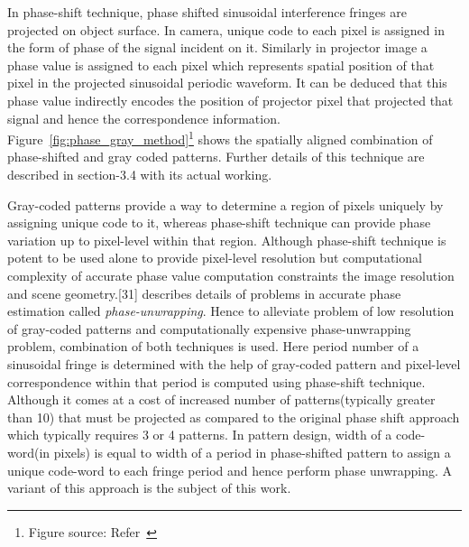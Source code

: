 \begin{enumerate}
\begin{enumerate}
In phase-shift technique, phase shifted sinusoidal interference fringes are projected on object surface. In camera, unique code to each pixel is assigned in the form of phase of the signal incident on it. Similarly in projector image a phase value is assigned to each pixel which represents spatial position of that pixel in the projected sinusoidal periodic waveform. It can be deduced that this phase value indirectly encodes the position of projector pixel that projected that signal and hence the correspondence information. Figure~\ref{fig:phase_gray_method}\footnote{Figure source: Refer~\cite{25}} shows the spatially aligned combination of phase-shifted and gray coded patterns. Further details of this technique are described in section-3.4 with its actual working.\newline


Gray-coded patterns provide a way to determine a region of pixels uniquely by assigning unique code to it, whereas phase-shift technique can provide phase variation up to pixel-level within that region. Although phase-shift technique is potent to be used alone to provide pixel-level resolution but computational complexity of accurate phase value computation constraints the image resolution and scene geometry.[31] describes details of problems in accurate phase estimation called \textit{phase-unwrapping}. Hence to alleviate problem of low resolution of gray-coded patterns and computationally expensive phase-unwrapping problem, combination of both techniques is used. Here period number of a sinusoidal fringe is determined with the help of gray-coded pattern and pixel-level correspondence within that period is computed using phase-shift technique. Although it comes at a cost of increased number of patterns(typically greater than 10) that must be projected as compared to the original phase shift approach which typically requires 3 or 4 patterns. In pattern design, width of a code-word(in pixels) is equal to width of a period in phase-shifted pattern to assign a unique code-word to each fringe period and hence perform phase unwrapping. A variant of this approach is the subject of this work.


\end{enumerate}
\end{enumerate}
